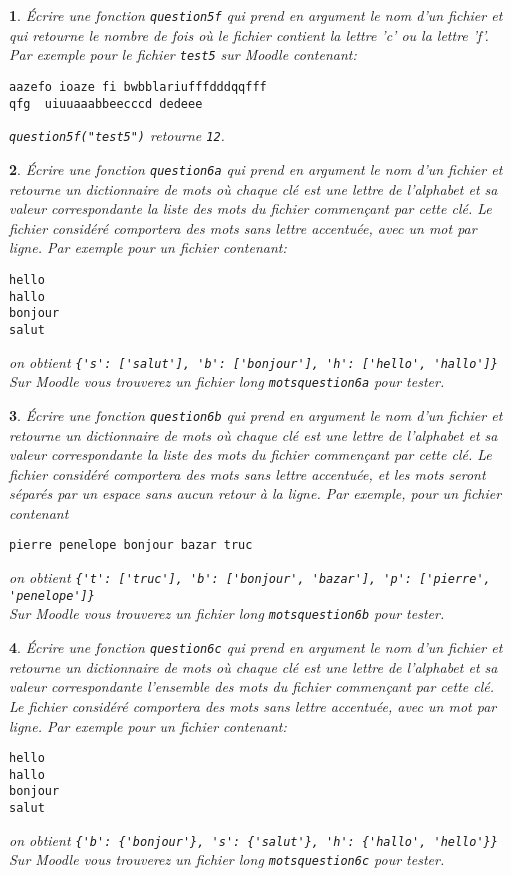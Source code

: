 \documentclass[10pt]{article}
\newtheorem{exi}{}
\newenvironment{exo}{\begin{exi}\em}{\end{exi}}
\begin{document}
\vspace*{-2ex}
\begin{exo}
    Écrire une fonction {\tt question5f} qui prend en argument le nom d'un fichier et qui retourne le nombre de fois où le fichier contient la lettre 'c' ou la
lettre 'f'.
Par exemple pour le fichier \verb+test5+ sur Moodle contenant: 
\begin{verbatim} 
aazefo ioaze fi bwbblariufffdddqqfff
qfg  uiuuaaabbeecccd dedeee
\end{verbatim} 
\verb+question5f("test5")+ retourne \verb+12+.
\end{exo}
\vspace*{-2ex}
\begin{exo}
    Écrire une fonction \verb+question6a+ qui prend en argument le nom d'un fichier
et retourne un dictionnaire de mots où chaque clé est une lettre de
l'alphabet et sa valeur correspondante la liste des mots du fichier commençant
par cette clé. Le fichier considéré comportera des mots 
sans lettre accentuée, avec un mot par ligne. Par exemple pour un fichier
contenant:
\begin{verbatim}
hello
hallo
bonjour
salut
\end{verbatim}
on obtient \verb+{'s': ['salut'], 'b': ['bonjour'], 'h': ['hello', 'hallo']}+\\
Sur Moodle vous trouverez un fichier long \verb+motsquestion6a+ pour tester.
\end{exo}
\vspace*{-2ex}
\begin{exo}
    Écrire une fonction \verb+question6b+ qui prend en argument le nom d'un fichier
et retourne un dictionnaire de mots où chaque clé est une lettre de
l'alphabet et sa valeur correspondante la liste des mots du fichier commençant
par cette clé. Le fichier considéré comportera des mots sans lettre accentuée, et les mots seront séparés par un espace sans aucun retour
à la ligne.
Par exemple, pour un fichier contenant
\begin{verbatim}
pierre penelope bonjour bazar truc
\end{verbatim}
on obtient \verb+{'t': ['truc'], 'b': ['bonjour', 'bazar'], 'p': ['pierre', 'penelope']}+\\
Sur Moodle vous trouverez un fichier long \verb+motsquestion6b+ pour tester.
\end{exo}
\vspace*{-2ex}
\begin{exo}
    Écrire une fonction \verb+question6c+ qui prend en argument le nom d'un fichier
et retourne un dictionnaire de mots où chaque clé est une lettre de
l'alphabet et sa valeur correspondante l'ensemble des mots du fichier commençant
par cette clé. Le fichier considéré comportera des mots 
sans lettre accentuée, avec un mot par ligne. Par exemple pour un fichier
contenant:
\begin{verbatim}
hello
hallo
bonjour
salut
\end{verbatim}
on obtient \verb+{'b': {'bonjour'}, 's': {'salut'}, 'h': {'hallo', 'hello'}}+\\
Sur Moodle vous trouverez un fichier long \verb+motsquestion6c+ pour tester.
\end{exo}
\end{document}
